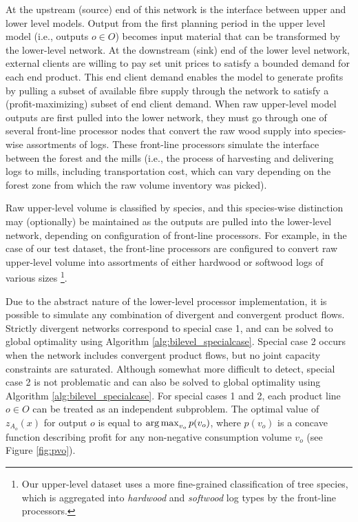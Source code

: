 At the upstream (source) end of this network is the interface between upper and lower level models. 
Output from the first planning period in the upper level model (i.e., outputs $o \in O$) becomes input material that can be transformed by the lower-level network. 
At the downstream (sink) end of the lower level network, external clients are willing to pay set unit prices to satisfy a bounded demand for each end product. 
This end client demand enables the model to generate profits by pulling a subset of available fibre supply through the network to satisfy a (profit-maximizing) subset of end client demand.
When raw upper-level model outputs are first pulled into the lower network, they must go through one of several front-line processor nodes that convert the raw wood supply into species-wise assortments of logs. 
These front-line processors simulate the interface between the forest and the mills (i.e., the process of harvesting and delivering logs to mills, including transportation cost, which can vary depending on the forest zone from which the raw volume inventory was picked).

Raw upper-level volume is classified by species, and this species-wise distinction may (optionally) be maintained as the outputs are pulled into the lower-level network, depending on configuration of front-line processors. 
For example, in the case of our test dataset, the front-line processors are configured to convert raw upper-level volume into assortments of either hardwood or softwood logs of various sizes \footnote{Our upper-level dataset uses a more fine-grained classification of tree species, which is aggregated into \emph{hardwood} and \emph{softwood} log types by the front-line processors.}.

Due to the abstract nature of the lower-level processor implementation, it is possible to simulate any combination of divergent and convergent product flows. 
Strictly divergent networks correspond to special case 1, and can be solved to global optimality using Algorithm \ref{alg:bilevel_specialcase}. 
Special case 2 occurs when the network includes convergent product flows, but no joint capacity constraints are saturated. 
Although somewhat more difficult to detect, special case 2 is not problematic and can also be solved to global optimality using Algorithm \ref{alg:bilevel_specialcase}.
For special cases 1 and 2, each product line $o \in O$ can be treated as an independent subproblem. 
The optimal value of $z_{A_o} (x)$ for output $o$ is equal to $\operatorname*{arg\,max}_{v_o} p(v_o)$, where $p(v_o)$ is a concave function describing profit for any non-negative consumption volume $v_o$ (see Figure \ref{fig:pvo}). 

